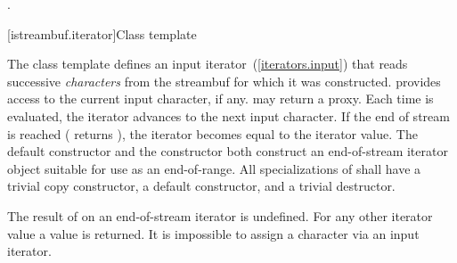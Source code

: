 \begin{itemdescr}
\pnum
\returns
{}.
\end{itemdescr}

[istreambuf.iterator]{Class template }

\pnum
The
class template
defines an input iterator~(\ref{iterators.input}) that
reads successive
\textit{characters}
from the streambuf for which it was constructed.
provides access to the current input character, if any.
\enternote {} may return a proxy. \exitnote
Each time
is evaluated, the iterator advances to the next input character.
If the end of stream is reached ( returns
),
the iterator becomes equal to the
iterator value.
The default constructor
and the constructor
both construct an end-of-stream iterator object suitable for use
as an end-of-range.
All specializations of  shall have a trivial copy
constructor, a  default constructor, and a trivial destructor.

\pnum
The result of
on an end-of-stream iterator is undefined.
%
For any other iterator value a
value is returned.
It is impossible to assign a character via an input iterator.

%

